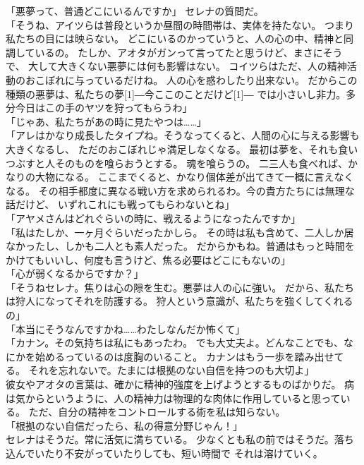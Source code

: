\documentclass[../IHMain]{subfiles}
\begin{document}
「悪夢って、普通どこにいるんですか」
セレナの質問だ。\\
「そうね、アイツらは普段というか昼間の時間帯は、実体を持たない。
つまり私たちの目には映らない。
どこにいるのかっていうと、人の心の中、精神と同調しているの。
たしか、アオタがガンって言ってたと思うけど、まさにそうで、
大して大きくない悪夢には何も影響はない。
コイツらはただ、人の精神活動のおこぼれに与っているだけね。
人の心を惑わしたり出来ない。
だからこの種類の悪夢は、私たちの夢\scalebox{3}[1]{―}今ここのことだけど\scalebox{3}[1]{―}
では小さいし非力。多分今日はこの手のヤツを狩ってもらうわ」\\
「じゃあ、私たちがあの時に見たやつは……」\\
「アレはかなり成長したタイプね。そうなってくると、人間の心に与える影響も大きくなるし、
ただのおこぼれじゃ満足しなくなる。
最初は夢を、それも食いつぶすと人そのものを喰らおうとする。
魂を喰らうの。
二三人も食べれば、かなりの大物になる。
ここまでくると、かなり個体差が出てきて一概に言えなくなる。
その相手都度に異なる戦い方を求められるわ。今の貴方たちには無理な話だけど、
いずれこれにも戦ってもらわないとね」\\
「アヤメさんはどれぐらいの時に、戦えるようになったんですか」\\
「私はたしか、一ヶ月ぐらいだったかしら。
その時は私も含めて、二人しか居なかったし、しかも二人とも素人だった。
だからかもね。普通はもっと時間をかけてもいいし、何度も言うけど、焦る必要はどこにもないの」\\
「心が弱くなるからですか？」\\
「そうねセレナ。焦りは心の隙を生む。悪夢は人の心に強い。
だから、私たちは狩人になってそれを防護する。
狩人という意識が、私たちを強くしてくれるの」\\
「本当にそうなんですかね……わたしなんだか怖くて」\\
「カナン。その気持ちは私にもあったわ。
でも大丈夫よ。どんなことでも、なにかを始めるっているのは度胸のいること。
カナンはもう一歩を踏み出せてる。
それを忘れないで。たまには根拠のない自信を持つのも大切よ」\\
彼女やアオタの言葉は、確かに精神的強度を上げようとするものばかりだ。
病は気からというように、人の精神力は物理的な肉体に作用していると思っている。
ただ、自分の精神をコントロールする術を私は知らない。\\
「根拠のない自信だったら、私の得意分野じゃん！」\\
セレナはそうだ。常に活気に満ちている。
少なくとも私の前ではそうだ。落ち込んでいたり不安がっていたりしても、短い時間で
それは溶けていく。\\
\end{document}

